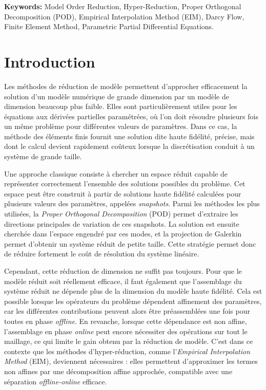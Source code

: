 \documentclass[12pt,a4paper]{article}
\begin{document}
\noindent\textbf{Keywords:} Model Order Reduction, Hyper-Reduction, Proper Orthogonal Decomposition (POD), Empirical Interpolation Method (EIM), Darcy Flow, Finite Element Method, Parametric Partial Differential Equations.

\vfill %

\newpage




\section{Introduction}

Les méthodes de réduction de modèle permettent d’approcher efficacement la solution d’un modèle numérique de grande dimension par un modèle de dimension beaucoup plus faible. Elles sont particulièrement utiles pour les équations aux dérivées partielles paramétrées, où l’on doit résoudre plusieurs fois un même problème pour différentes valeurs de paramètres. Dans ce cas, la méthode des éléments finis fournit une solution dite haute fidélité, précise, mais dont le calcul devient rapidement coûteux lorsque la discrétisation conduit à un système de grande taille.

Une approche classique consiste à chercher un espace réduit capable de représenter correctement l’ensemble des solutions possibles du problème. Cet espace peut être construit à partir de solutions haute fidélité calculées pour plusieurs valeurs des paramètres, appelées \textit{snapshots}. Parmi les méthodes les plus utilisées, la \textit{Proper Orthogonal Decomposition} (POD) permet d’extraire les directions principales de variation de ces snapshots. La solution est ensuite cherchée dans l’espace engendré par ces modes, et la projection de Galerkin permet d’obtenir un système réduit de petite taille. Cette stratégie permet donc de réduire fortement le coût de résolution du système linéaire.

Cependant, cette réduction de dimension ne suffit pas toujours. Pour que le modèle réduit soit réellement efficace, il faut également que l’assemblage du système réduit ne dépende plus de la dimension du modèle haute fidélité. Cela est possible lorsque les opérateurs du problème dépendent affinement des paramètres, car les différentes contributions peuvent alors être préassemblées une fois pour toutes en phase \textit{offline}. En revanche, lorsque cette dépendance est non affine, l’assemblage en phase \textit{online} peut encore nécessiter des opérations sur tout le maillage, ce qui limite le gain obtenu par la réduction de modèle. C’est dans ce contexte que les méthodes d’hyper-réduction, comme l’\textit{Empirical Interpolation Method} (EIM), deviennent nécessaires : elles permettent d’approximer les termes non affines par une décomposition affine approchée, compatible avec une séparation \textit{offline-online} efficace.
\end{document}
